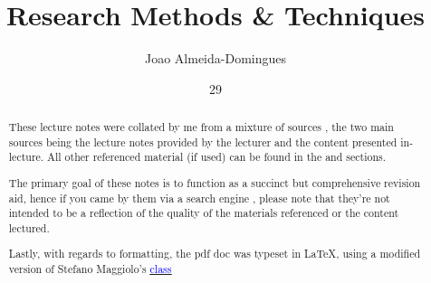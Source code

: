 \documentclass[english,course]{Notes}
\title{Research Methods \& Techniques}
\author{Joao Almeida-Domingues}
\date{29}{09}{2020}
\begin{document}

\begin{abstract}
	\par{These lecture notes were collated by me from a mixture of sources , the two main sources being the lecture notes provided by the lecturer and the 
content presented in-lecture. All other referenced material (if used) can be found in the  and  sections.}
	\par{The primary goal of these notes is to function as a succinct but comprehensive revision aid, hence if you came by them via a search engine , please note 
that they're not intended to be a reflection of the quality of the materials referenced or the content lectured.}
	\par{Lastly, with regards to formatting, the pdf doc was typeset in \LaTeX , using a modified version of Stefano Maggiolo's \href{http://blog.poormansmath.net/
latex-class-for-lecture-notes/}{\underline{\textcolor{blue}{class}}}}
\end{abstract}
\newpage





\newpage
\nocite{*}
\printbibliography

\end{document}
